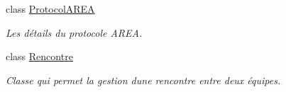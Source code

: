 \begin{DoxyCompactItemize}
class \hyperlink{classcom_1_1example_1_1area_1_1_protocol_a_r_e_a}{Protocol\+A\+R\+EA}
\begin{DoxyCompactList}\small\item\em Les détails du protocole A\+R\+EA. \end{DoxyCompactList}\item 
class \hyperlink{classcom_1_1example_1_1area_1_1_rencontre}{Rencontre}
\begin{DoxyCompactList}\small\item\em Classe qui permet la gestion d\textquotesingle{}une rencontre entre deux équipes. \end{DoxyCompactList}\end{DoxyCompactItemize}
